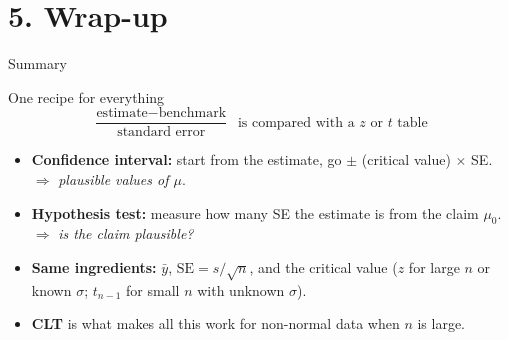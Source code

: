 \documentclass[
  11pt,
  ignorenonframetext,
  aspectratio=169,
]{beamer}
\providecommand{\tightlist}{%
  \setlength{\itemsep}{0pt}\setlength{\parskip}{0pt}}
\newcommand{\se}{\mathrm{SE}}
\begin{document}

\section{5. Wrap-up}\label{wrap-up}

\begin{frame}{Summary}
\protect{}\label{the-whole-session-in-one-picture}
\begin{block}{One recipe for everything}
\protect{}\label{one-recipe-for-everything}
\[\frac{\text{estimate}-\text{benchmark}}{\text{standard error}}\ \text{ is compared with a } z \text{ or } t \text{ table}\]
\end{block}

\begin{itemize}
\tightlist
\item
  \textbf{Confidence interval:} start from the estimate, go \(\pm\)
  (critical value) \(\times\) SE. \(\Rightarrow\) \emph{plausible values
  of \(\mu\)}.
\item
  \textbf{Hypothesis test:} measure how many SE the estimate is from the
  claim \(\mu_0\). \(\Rightarrow\) \emph{is the claim plausible?}
\item
  \textbf{Same ingredients:} \(\bar y\), \(\se=s/\sqrt n\), and the
  critical value (\(z\) for large \(n\) or known \(\sigma\); \(t_{n-1}\)
  for small \(n\) with unknown \(\sigma\)).
\item
  \textbf{CLT} is what makes all this work for non-normal data when
  \(n\) is large.
\end{itemize}
\end{frame}
\end{document}

